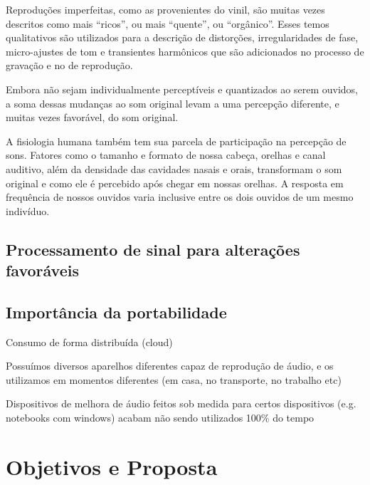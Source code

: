 Reproduções imperfeitas, como as provenientes do vinil, são muitas vezes descritos como mais “ricos”, ou mais “quente”, ou “orgânico”. Esses temos qualitativos são utilizados para a descrição de distorções, irregularidades de fase, micro-ajustes de tom e transientes harmônicos que são adicionados no processo de gravação e no de reprodução. 

Embora não sejam individualmente perceptíveis e quantizados ao serem ouvidos, a soma dessas mudanças ao som original levam a uma percepção diferente, e muitas vezes favorável, do som original.


A fisiologia humana também tem sua parcela de participação na percepção de sons. Fatores como o tamanho e formato de nossa cabeça, orelhas e canal auditivo, além da densidade das cavidades nasais e orais, transformam o som original e como ele é percebido após chegar em nossas orelhas.  A resposta em frequência de nossos ouvidos varia inclusive entre os dois ouvidos de um mesmo indivíduo.


\subsection{Processamento de sinal para alterações favoráveis}\label{subsec:processamentoSinalAlteracoesFavoraveis}
\subsection{Importância da portabilidade}\label{subsec:importanciaPortabilidade}

\color{orange}
Consumo de forma distribuída (cloud)

Possuímos diversos aparelhos diferentes capaz de reprodução de áudio, e os utilizamos em momentos diferentes (em casa, no transporte, no trabalho etc)

Dispositivos de melhora de áudio feitos sob medida para certos dispositivos (e.g. notebooks com windows) acabam não sendo utilizados 100\% do tempo

\color{black}

\section{Objetivos e Proposta}

